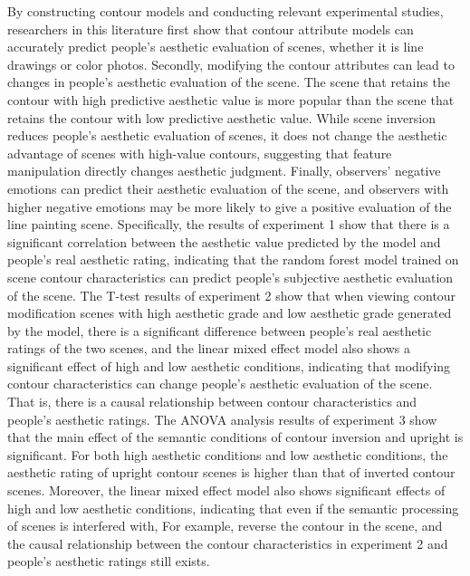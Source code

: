 \documentclass[
  man,floatsintext]{apa6}
\begin{document}
By constructing contour models and conducting relevant experimental studies, researchers in this literature first show that contour attribute models can accurately predict people's aesthetic evaluation of scenes, whether it is line drawings or color photos. Secondly, modifying the contour attributes can lead to changes in people's aesthetic evaluation of the scene. The scene that retains the contour with high predictive aesthetic value is more popular than the scene that retains the contour with low predictive aesthetic value. While scene inversion reduces people's aesthetic evaluation of scenes, it does not change the aesthetic advantage of scenes with high-value contours, suggesting that feature manipulation directly changes aesthetic judgment. Finally, observers' negative emotions can predict their aesthetic evaluation of the scene, and observers with higher negative emotions may be more likely to give a positive evaluation of the line painting scene. Specifically, the results of experiment 1 show that there is a significant correlation between the aesthetic value predicted by the model and people's real aesthetic rating, indicating that the random forest model trained on scene contour characteristics can predict people's subjective aesthetic evaluation of the scene. The T-test results of experiment 2 show that when viewing contour modification scenes with high aesthetic grade and low aesthetic grade generated by the model, there is a significant difference between people's real aesthetic ratings of the two scenes, and the linear mixed effect model also shows a significant effect of high and low aesthetic conditions, indicating that modifying contour characteristics can change people's aesthetic evaluation of the scene. That is, there is a causal relationship between contour characteristics and people's aesthetic ratings. The ANOVA analysis results of experiment 3 show that the main effect of the semantic conditions of contour inversion and upright is significant. For both high aesthetic conditions and low aesthetic conditions, the aesthetic rating of upright contour scenes is higher than that of inverted contour scenes. Moreover, the linear mixed effect model also shows significant effects of high and low aesthetic conditions, indicating that even if the semantic processing of scenes is interfered with, For example, reverse the contour in the scene, and the causal relationship between the contour characteristics in experiment 2 and people's aesthetic ratings still exists.
\end{document}
